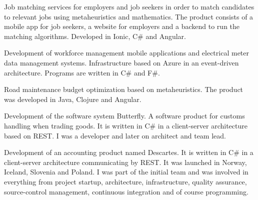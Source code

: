 \documentclass[10pt,a4paper]{altacv}
\begin{document}




\begin{fullwidth}
\makecvheader
\end{fullwidth}




Job matching services for employers and job seekers in order to match candidates to relevant jobs using metaheuristics and mathematics. The product consists of a mobile app for job seekers, a website for employers and a backend to run the matching algorithms. Developed in Ionic, C\# and Angular.

\divider

Development of workforce management mobile applications and electrical meter data management systems. Infrastructure based on Azure in an event-driven architecture. Programs are written in C\# and F\#.

\divider

Road maintenance budget optimization based on metaheuristics. The product was developed in Java, Clojure and Angular.

\divider

Development of the software system Butterfly. A software product for customs handling when trading goods. It is written in C\# in a client-server architecture based on REST. I was a developer and later on  architect and team lead.

\divider

Development of an accounting product named Descartes. It is written in C\# in a client-server architecture communicating by REST. It was launched in Norway, Iceland, Slovenia and Poland. I was part of the initial team and was involved in everything from project startup, architecture, infrastructure, quality assurance, source-control management, continuous integration and of course programming.
\end{document}
